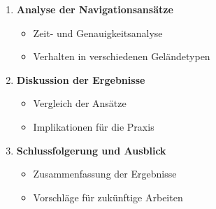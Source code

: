 \begin{enumerate}
    \item \textbf{Analyse der Navigationsansätze}
    \begin{itemize}
        \item Zeit- und Genauigkeitsanalyse
        \item Verhalten in verschiedenen Geländetypen
    \end{itemize}
    
    \item \textbf{Diskussion der Ergebnisse}
    \begin{itemize}
        \item Vergleich der Ansätze
        \item Implikationen für die Praxis
    \end{itemize}
    
    \item \textbf{Schlussfolgerung und Ausblick}
    \begin{itemize}
        \item Zusammenfassung der Ergebnisse
        \item Vorschläge für zukünftige Arbeiten
    \end{itemize}
\end{enumerate}
